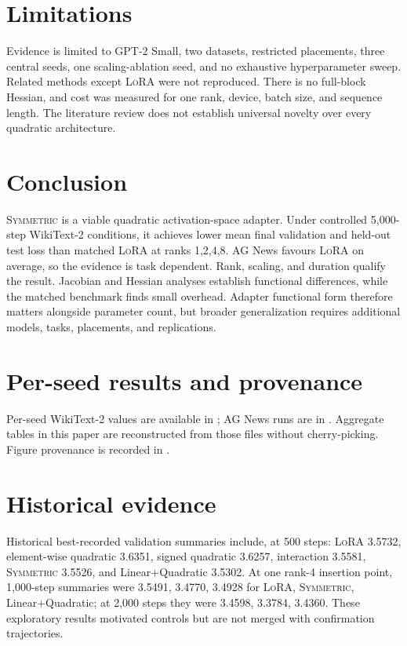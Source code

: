 \documentclass[11pt]{article}
\newcommand{\sym}{\textsc{Symmetric}}\newcommand{\lora}{\textsc{LoRA}}
\begin{document}
\section{Limitations}
Evidence is limited to GPT-2 Small, two datasets, restricted placements, three central seeds, one scaling-ablation seed, and no exhaustive hyperparameter sweep. Related methods except \lora{} were not reproduced. There is no full-block Hessian, and cost was measured for one rank, device, batch size, and sequence length. The literature review does not establish universal novelty over every quadratic architecture.

\section{Conclusion}
\sym{} is a viable quadratic activation-space adapter. Under controlled 5,000-step WikiText-2 conditions, it achieves lower mean final validation and held-out test loss than matched \lora{} at ranks 1,2,4,8. AG News favours \lora{} on average, so the evidence is task dependent. Rank, scaling, and duration qualify the result. Jacobian and Hessian analyses establish functional differences, while the matched benchmark finds small overhead. Adapter functional form therefore matters alongside parameter count, but broader generalization requires additional models, tasks, placements, and replications.

\appendix
\section{Per-seed results and provenance}
Per-seed WikiText-2 values are available in ; AG News runs are in . Aggregate tables in this paper are reconstructed from those files without cherry-picking. Figure provenance is recorded in .

\section{Historical evidence}\label{app:history}
Historical best-recorded validation summaries include, at 500 steps: \lora{} 3.5732, element-wise quadratic 3.6351, signed quadratic 3.6257, interaction 3.5581, \sym{} 3.5526, and Linear+Quadratic 3.5302. At one rank-4 insertion point, 1,000-step summaries were 3.5491, 3.4770, 3.4928 for \lora{}, \sym{}, Linear+Quadratic; at 2,000 steps they were 3.4598, 3.3784, 3.4360. These exploratory results motivated controls but are not merged with confirmation trajectories.
\end{document}
